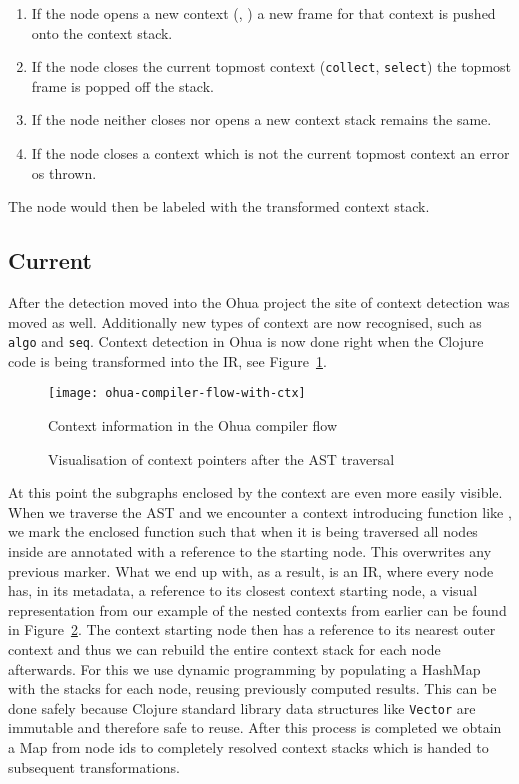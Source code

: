 \begin{enumerate}
  \item If the node opens a new context (\smap{}, \ifop{}) a new frame for that context is pushed onto the context stack.
  \item If the node closes the current topmost context (\texttt{collect}, \texttt{select}) the topmost frame is popped off the stack.
  \item If the node neither closes nor opens a new context stack remains the same.
  \item If the node closes a context which is not the current topmost context an error os thrown.
\end{enumerate}

The node would then be labeled with the transformed context stack.

\subsection{Current}

After the detection moved into the Ohua project the site of context detection was moved as well.
Additionally new types of context are now recognised, such as \texttt{algo} and \texttt{seq}.
Context detection in Ohua is now done right when the Clojure code is being transformed into the IR, see Figure~\ref{fig:ohua-compiler-flow-with-ctx}.

\begin{figure}
  \texttt{[image: ohua-compiler-flow-with-ctx]}
  \caption{Context information in the Ohua compiler flow}
  \label{fig:ohua-compiler-flow-with-ctx}
\end{figure}

\begin{figure}
  \caption{Visualisation of context pointers after the AST traversal}
  \label{fig:context-pointers}
\end{figure}

At this point the subgraphs enclosed by the context are even more easily visible.
When we traverse the AST and we encounter a context introducing function like \smap{}, we mark the enclosed function such that when it is being traversed all nodes inside are annotated with a reference to the \smap{} starting node.
This overwrites any previous marker.
What we end up with, as a result, is an IR, where every node has, in its metadata, a reference to its closest context starting node, a visual representation from our example of the nested contexts from earlier can be found in Figure~\ref{fig:context-pointers}.
The context starting node then has a reference to its nearest outer context and thus we can rebuild the entire context stack for each node afterwards.
For this we use dynamic programming by populating a HashMap with the stacks for each node, reusing previously computed results.
This can be done safely because Clojure standard library data structures like \texttt{Vector} are immutable and therefore safe to reuse.
After this process is completed we obtain a Map from node ids to completely resolved context stacks which is handed to subsequent transformations.


